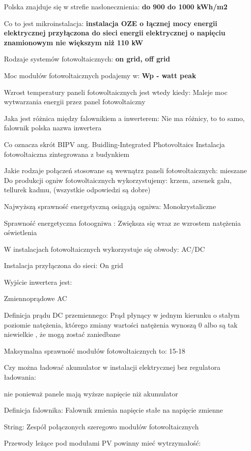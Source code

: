 \documentclass[12pt,a4paper]{article}
\begin{document}
Polska znajduje się w strefie nasłonecznienia: \textbf{do 900 do 1000 kWh/m2}

Co to jest mikroinstalacja: \textbf{instalacja OZE o łącznej mocy energii elektrycznej przyłączona do sieci energii elektrycznej o napięciu znamionowym nie większym niż 110 kW}

Rodzaje systemów fotowoltaicznych: \textbf{on grid, off grid}

Moc modułów fotowoltaicznych podajemy w: \textbf{Wp - watt peak}

Wzrost temperatury paneli fotowoltaicznych jest wtedy kiedy:
Maleje moc wytwarzania energii przez panel fotowoltaiczny

Jaka jest różnica między falownikiem a inwerterem:
Nie ma różnicy, to to samo, falownik polska nazwa inwertera

Co oznacza skrót BIPV ang. Buidling-Integrated Photovoltaics
Instalacja fotowoltaiczna zintegrowana z budynkiem

Jakie rodzaje połączeń stosowane są wewnątrz paneli fotowoltaicznych:
mieszane
Do produkcji ogniw fotowoltaicznych wykorzystujemy:
krzem, arsenek galu, tellurek kadmu, (wszystkie odpowiedzi są dobre)

Najwyższą sprawność energetyczną osiągają ogniwa:
Monokrystaliczne

Sprawność energetyczna fotoogniwa :
Zwiększa się wraz ze wzrostem natężenia oświetlenia

W instalacjach fotowoltaicznych wykorzystuje się obwody:
AC/DC

Instalacja przyłączona do sieci:
On grid

Wyjście inwertera jest:

Zmiennoprądowe AC

Definicja prądu DC przemiennego:
Prąd płynący w jednym kierunku o stałym poziomie natężenia, którego zmiany wartości natężenia wynoszą 0 albo są tak niewielkie , że mogą zostać zaniedbane

Maksymalna sprawność modułów fotowoltaicznych to:
15-18%

Czy można ładować akumulator w instalacji elektrycznej bez regulatora ładowania:

nie ponieważ panele mają wyższe napięcie niż akumulator

Definicja falownika:
Falownik zmienia napięcie stałe na napięcie zmienne

String:
Zespół połączonych szeregowo modułów fotowoltaicznych

Przewody leżące pod modułami PV powinny mieć wytrzymałość:
\end{document}
